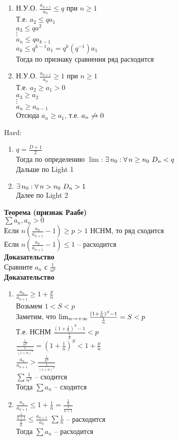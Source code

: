 \documentclass[12pt]{article}
\begin{document}
\begin{enumerate}
    \item Н.У.О. $\frac{a_{n+1}}{a_n} \leq q$ при $n \geq 1$\\
    Т.е. $a_2 \leq qa_1$\\
    $a_3 \leq qa^2$\\
    $\vdots$\\
    $a_n \leq qa_{k-1}$\\
    $a_k \leq q^{k-1} a_1 = q^k(q^{-1})a_1$\\
    Тогда по признаку сравнения ряд расходится
    \item Н.У.О. $\frac{a_{n+1}}{a_n} \geq 1$ при $n \geq 1$\\
    Т.е. $a_2 \geq a_1 > 0$\\
    $a_3 \geq a_2$\\
    $\vdots$\\
    $a_n \geq a_{n-1}$\\
    Отсюда $a_n \geq a_1$, т.е. $a_n \not\rightarrow 0$
\end{enumerate}
Hard:
\begin{enumerate}
    \item $q = \frac{D+1}2$\\
    Тогда по определению $\lim$: $\exists\, n_0: \forall\, n \geq n_0\ D_n < q$\\
    Дальше по Light 1
    \item $\exists\, n_0: \forall\, n > n_0\ D_n > 1$\\
    Далее по Light 2
\end{enumerate}
\textbf{Теорема (признак Раабе)}\\
$\sum a_n, a_n > 0$\\
Если $n(\frac{a_n}{a_{n+1}} - 1) \geq p > 1$ НСНМ, то ряд сходится\\
Если $n(\frac{a_n}{a_{n+1}} - 1) \leq 1$ -- расходится\\
\textbf{Доказательство}\\
Сравните $a_n$ с $\frac1{n^p}$\\
\textbf{Доказательство}
\begin{enumerate}
    \item $\frac{a_n}{a_{n+1}}\geq 1 + \frac pn$\\
    Возьмем $1 < S < p$\\
    Заметим, что $\lim_{n\rightarrow +\infty} \frac{(1+\frac1n)^S-1}{\frac1n} = S < p$\\
    Т.е. НСНМ $\frac{(1+\frac1n)^S-1}{\frac1n} < p$\\
    $\frac{\frac1{n^S}}{\frac1{(1+n)^S}}=(1+\frac1n)^S < 1 + \frac pn$\\
    $\frac{a_n}{a_{n+1}} > \frac{\frac1{n^S}}{\frac1{(1+n)^S}}$\\
    $\sum \frac1{n^S}$ -- сходится\\
    Тогда $\sum a_n$ -- сходится
    \item $\frac{a_n}{a_{n+1}} \leq 1+\frac1n = \frac{\frac1n}{\frac1{n+1}}$\\
    $\frac{\frac1{n+1}}{\frac1n} \leq \frac{a_{n+1}}{a_n}$
    $\sum \frac1n$ -- расходится\\
    Тогда $\sum a_n$ -- расходится
\end{enumerate}
\end{document}
